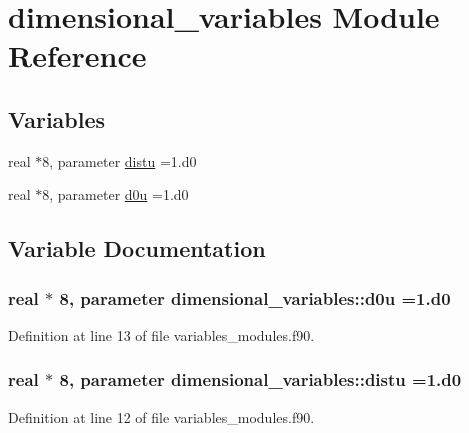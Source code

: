 \hypertarget{namespacedimensional__variables}{}\section{dimensional\+\_\+variables Module Reference}
\label{namespacedimensional__variables}
\subsection*{Variables}
\begin{DoxyCompactItemize}
\item 
real $\ast$8, parameter \hyperlink{namespacedimensional__variables_a227a932014a237911a8056b6958a775d}{distu} =1.d0
\item 
real $\ast$8, parameter \hyperlink{namespacedimensional__variables_a74941571057c34bc06c7ba83dc5bc762}{d0u} =1.d0
\end{DoxyCompactItemize}


\subsection{Variable Documentation}
\subsubsection[{\texorpdfstring{d0u}{d0u}}]{\setlength{\rightskip}{0pt plus 5cm}real $\ast$ 8, parameter dimensional\+\_\+variables\+::d0u =1.d0}\hypertarget{namespacedimensional__variables_a74941571057c34bc06c7ba83dc5bc762}{}\label{namespacedimensional__variables_a74941571057c34bc06c7ba83dc5bc762}


Definition at line 13 of file variables\+\_\+modules.\+f90.

\subsubsection[{\texorpdfstring{distu}{distu}}]{\setlength{\rightskip}{0pt plus 5cm}real $\ast$ 8, parameter dimensional\+\_\+variables\+::distu =1.d0}\hypertarget{namespacedimensional__variables_a227a932014a237911a8056b6958a775d}{}\label{namespacedimensional__variables_a227a932014a237911a8056b6958a775d}


Definition at line 12 of file variables\+\_\+modules.\+f90.

